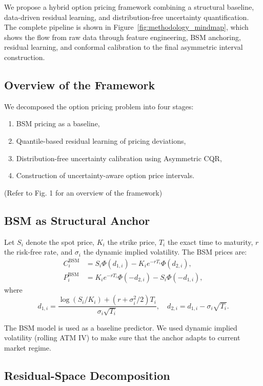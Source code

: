 \documentclass[runningheads]{llncs}
\newcommand{\rev}[1]{{\color{blue}#1}}
\begin{document}
We propose a hybrid option pricing framework combining a structural baseline, data-driven residual learning, and distribution-free uncertainty quantification. \rev{The complete pipeline is shown in Figure~\ref{fig:methodology_mindmap}, which shows the flow from raw data through feature engineering, BSM anchoring, residual learning, and conformal calibration to the final asymmetric interval construction.}

\subsection{Overview of the Framework}
We decomposed the option pricing problem into four stages:
\begin{enumerate}
    \item BSM pricing as a baseline,
    \item \rev{Quantile-based} residual learning of pricing deviations,
    \item Distribution-free uncertainty calibration using \rev{Asymmetric CQR},
    \item Construction of uncertainty-aware option price intervals.
\end{enumerate}
(Refer to Fig. 1 for an overview of the framework)



\subsection{BSM as Structural Anchor}

Let $S_i$ denote the spot price, $K_i$ the strike price, $T_i$ the exact time to maturity, $r$ the risk-free rate, and $\sigma_i$ the dynamic implied volatility. The BSM prices are:
\begin{align}
C^{\text{BSM}}_i &= S_i \Phi(d_{1,i}) - K_i e^{-rT_i} \Phi(d_{2,i}), \\
P^{\text{BSM}}_i &= K_i e^{-rT_i} \Phi(-d_{2,i}) - S_i \Phi(-d_{1,i}),
\end{align}
where
\begin{equation}
d_{1,i} = \frac{\log(S_i/K_i) + (r + \sigma_i^2/2)T_i}{\sigma_i \sqrt{T_i}}, \quad d_{2,i} = d_{1,i} - \sigma_i \sqrt{T_i}.
\end{equation}

\rev{The BSM model is used as a baseline predictor. We used dynamic implied volatility (rolling ATM IV) to make sure that the anchor adapts to current market regime.}

\subsection{Residual-Space Decomposition}
\end{document}
